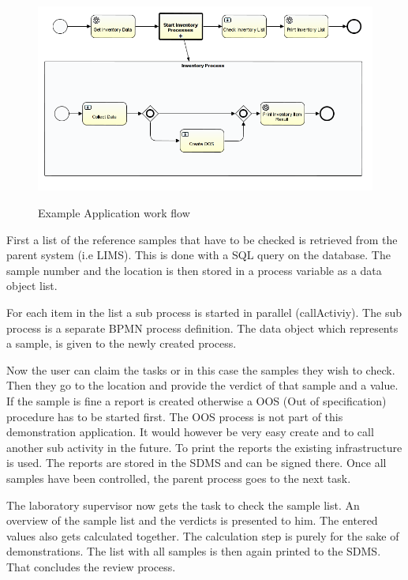 \documentclass[paper=a4,twoside=false,BCOR=0mm,DIV=calc,fontsize=12pt]{scrartcl}
\begin{document}
\begin{figure}
    \begin{center}
      \includegraphics[width=1\textwidth]{./img/PanExampleBPMN.png}\\
    \end{center}
  \caption{Example Application work flow}
  \label{panexampleWorkflow}
\end{figure} 

First a list of the reference samples that have to be checked is retrieved from the parent system (i.e LIMS). This is done with a SQL query on the database. 
The sample number and the location is then stored in a process variable as a data object list.

For each item in the list a sub process is started in parallel (callActiviy). The sub process is a separate BPMN process definition.
The data object which represents a sample, is given to the newly created process.

Now the user can claim the tasks or in this case the samples they wish to check. Then they go to the location and provide the verdict of that sample and a value. If the sample is fine a report is created otherwise a OOS (Out of specification) procedure has to be started first. The OOS process is not part of this demonstration application. It would however be very easy create and to call another sub activity in the future.
To print the reports the existing infrastructure is used. The reports are stored in the SDMS and can be signed there.
Once all samples have been controlled, the parent process goes to the next task.

The laboratory supervisor now gets the task to check the sample list. An overview of the sample list and the verdicts is presented to him. The entered values also gets calculated together. The calculation step is purely for the sake of demonstrations.
The list with all samples is then again printed to the SDMS. That concludes the review process.
\end{document}
